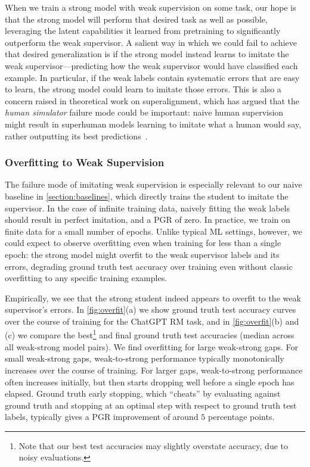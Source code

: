 When we train a strong model with weak supervision on some task, our hope is that the strong model will perform that desired task as well as possible, leveraging the latent capabilities it learned from pretraining to significantly outperform the weak supervisor. A salient way in which we could fail to achieve that desired generalization is if the strong model instead learns to imitate the weak supervisor---predicting how the weak supervisor would have classified each example. In particular, if the weak labels contain systematic errors that are easy to learn, the strong model could learn to imitate those errors. This is also a concern raised in theoretical work on superalignment, which has argued that the \emph{human simulator} failure mode could be important: naive human supervision might result in superhuman models learning to imitate what a human would say, rather outputting its best predictions~\citep{christiano2022eliciting}. 

\subsubsection{Overfitting to Weak Supervision}
\label{sec:results-overfitting}

The failure mode of imitating weak supervision is especially relevant to our naive baseline in \ref{section:baselines}, which directly trains the student to imitate the supervisor. In the case of infinite training data, naively fitting the weak labels should result in perfect imitation, and a PGR of zero. In practice, we train on finite data for a small number of epochs. Unlike typical ML settings, however, we could expect to observe overfitting even when training for less than a single epoch: the strong model might overfit to the weak supervisor labels and its errors, degrading ground truth test accuracy over training even without classic overfitting to any specific training examples.

Empirically, we see that the strong student indeed appears to overfit to the weak supervisor's errors. In \ref{fig:overfit}(a) we show ground truth test accuracy curves over the course of training for the ChatGPT RM task, and in \ref{fig:overfit}(b) and (c) we compare the best\footnote{Note that our best test accuracies may slightly overstate accuracy, due to noisy evaluations.} and final ground truth test accuracies (median across all weak-strong model pairs). We find overfitting for large weak-strong gaps. For small weak-strong gaps, weak-to-strong performance typically monotonically increases over the course of training. For larger gaps, weak-to-strong performance often increases initially, but then starts dropping well before a single epoch has elapsed. Ground truth early stopping, which ``cheats'' by evaluating against ground truth and stopping at an optimal step with respect to ground truth test labels, typically gives a PGR improvement of around $5$ percentage points.

